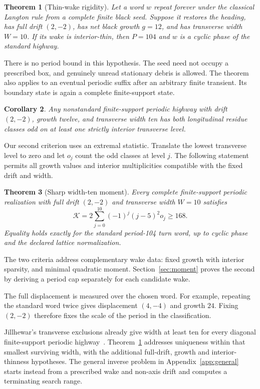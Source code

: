 \documentclass[11pt]{article}
\newtheorem{theorem}{Theorem}[section]
\newtheorem{corollary}[theorem]{Corollary}
\theoremstyle{definition}\newtheorem{definition}[theorem]{Definition}
\begin{document}
\begin{theorem}[Thin-wake rigidity]\label{thm:main}
Let a word $w$ repeat forever under the classical Langton rule from a complete
finite black seed. Suppose it restores the heading, has full drift $(2,-2)$,
has net black growth $g=12$, and has transverse width $W=10$. If its wake is
interior-thin, then $P=104$ and $w$ is a cyclic phase of the standard highway.
\end{theorem}

There is no period bound in this hypothesis. The seed need not occupy a
prescribed box, and genuinely unread stationary debris is allowed. The theorem
also applies to an eventual periodic suffix after an arbitrary finite transient.
Its boundary state is again a complete finite-support state.

\begin{corollary}\label{cor:thick}
Any nonstandard finite-support periodic highway with drift $(2,-2)$, growth
twelve, and transverse width ten has both longitudinal residue classes odd
on at least one strictly interior transverse level.
\end{corollary}

Our second criterion uses an extremal statistic. Translate the lowest
transverse level to zero and let $o_j$ count the odd classes at level $j$.
The following statement permits all growth values and interior multiplicities
compatible with the fixed drift and width.

\begin{theorem}[Sharp width-ten moment]\label{moment:thm:main}
Every complete finite-support periodic realization with full drift $(2,-2)$
and transverse width $W=10$ satisfies
\[
 \mathcal K=2\sum_{j=0}^{10}(-1)^j(j-5)^2o_j\ge168.
\]
Equality holds exactly for the standard period-104 turn word, up to cyclic
phase and the declared lattice normalization.
\end{theorem}

The two criteria address complementary wake data: fixed growth with interior
sparsity, and minimal quadratic moment. Section~\ref{sec:moment} proves the
second by deriving a period cap separately for each candidate wake.

The full displacement is measured over the chosen word. For example,
repeating the standard word twice gives displacement $(4,-4)$ and growth
$24$. Fixing $(2,-2)$ therefore fixes the scale of the period in the
classification.

Jillhewar's transverse exclusions already give width at least ten for every
diagonal finite-support periodic highway~\cite[Section~9, theorems ``No highway of transverse width two, four, six, eight'']{Jillhewar2026}.
Theorem~\ref{thm:main} addresses uniqueness within that smallest surviving
width, with the additional full-drift, growth and interior-thinness hypotheses.
The general inverse problem in Appendix~\ref{app:general} starts instead from
a prescribed wake and non-axis drift and computes a terminating search range.
\end{document}
